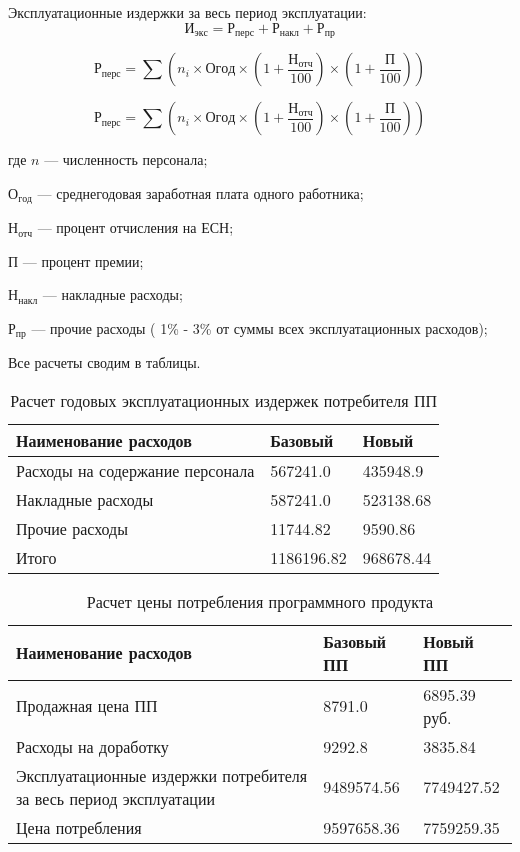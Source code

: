 Эксплуатационные издержки за весь период эксплуатации:
\begin{equation}
	И_{экс} =  Р_{перс} +  Р_{накл} +  Р_{пр}
\end{equation}

\begin{equation}
	Р_{перс} = \sum{} (n_i \times{} Огод \times{} (1 + \frac{Н_{отч}}{100}) \times{} (1 + \frac{П}{100}))
\end{equation}

\begin{equation}
	Р_{перс} = \sum{}(n_i \times{} Огод \times (1 + \frac{Н_{отч}}{100}) \times{} (1 + \frac{П}{100}))
\end{equation}

\begin{ESKDexplanation}
	\item[где ]{} $n$ --- численность персонала;
	\item{} $О_{год}$ --- среднегодовая заработная плата одного работника;
	\item{} $Н_{отч}$ --- процент отчисления на ЕСН;
	\item{} $П$ --- процент премии;
	\item{} $Н_{накл}$ --- накладные расходы;
	\item{} $Р_{пр}$ --- прочие расходы ( 1\% - 3\%  от суммы всех эксплуатационных расходов);
\end{ESKDexplanation}

\begin{par}
Все расчеты сводим в таблицы.
\begin{table}[H]
\caption{Расчет годовых эксплуатационных издержек потребителя ПП}
\begin{tabular}{|p{8cm}|p{4cm}|p{3.5cm}|}
\hline{}
Наименование расходов & Базовый & Новый \\
\hline{}
Расходы на содержание персонала & 567241.0 & 435948.9\\
\hline{}
Накладные расходы & 587241.0 & 523138.68\\
\hline{}
Прочие расходы & 11744.82 & 9590.86 \\
\hline{}
Итого & 1186196.82 & 968678.44 \\
\hline
\end{tabular}
\label{table:yearEkspIzd}
\end{table}

\begin{table}[H]
\caption{Расчет цены потребления программного продукта}
\begin{tabular}{|p{8cm}|p{4cm}|p{3.5cm}|}
\hline{}
Наименование расходов &  Базовый ПП & Новый ПП \\
\hline{}
Продажная цена ПП &  8791.0 & 6895.39 руб. \\
\hline{}
Расходы на доработку & 9292.8 & 3835.84 \\
\hline{}
Эксплуатационные издержки потребителя за весь период эксплуатации & 9489574.56 & 7749427.52 \\
\hline{}
Цена потребления & 9597658.36 & 7759259.35\\
\hline
\end{tabular}
\label{table:zhenaPotreblenija}
\end{table}
\end{par}


